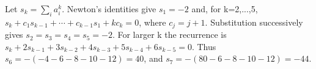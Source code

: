 Let $s_k=\sum_i a_i^k$. Newton's identities give $s_1=-2$ and, for k=2,...,5, $s_k+c_1s_{k-1}+\cdots+c_{k-1}s_1+kc_k=0$, where $c_j=j+1$. Substitution successively gives $s_2=s_3=s_4=s_5=-2$. For larger k the recurrence is $s_k+2s_{k-1}+3s_{k-2}+4s_{k-3}+5s_{k-4}+6s_{k-5}=0$. Thus $s_6=-(-4-6-8-10-12)=40$, and $s_7=-(80-6-8-10-12)=\boxed{-44}$.
